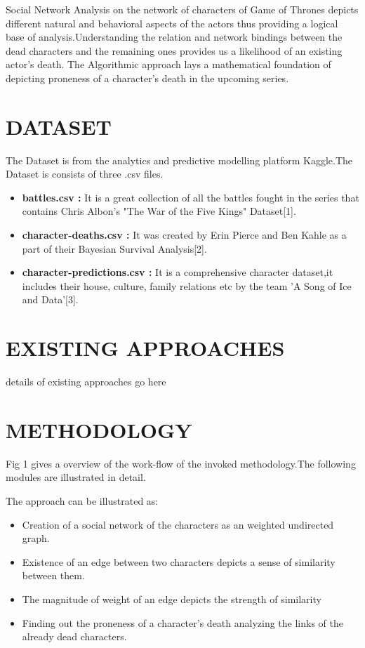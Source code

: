 \documentclass[conference]{IEEEtran}
\begin{document}
Social Network Analysis on the network of characters of Game of Thrones depicts different natural and behavioral aspects of the actors thus providing a logical base of analysis.Understanding the relation and network bindings between the dead characters and the remaining ones provides us a likelihood of an existing actor's death. The Algorithmic approach lays a mathematical foundation of depicting proneness of a character's death in the upcoming series.

\section{DATASET}

The Dataset is from the analytics and predictive modelling platform Kaggle.The Dataset is consists of three .csv files.

\begin{itemize}
  \item \textbf{battles.csv :} It is a great collection of all the battles fought in the series that contains Chris Albon's "The War of the Five Kings" Dataset[1].
  \item \textbf{character-deaths.csv :} It was created by Erin Pierce and Ben Kahle as a part of their Bayesian Survival Analysis[2].
  \item \textbf{character-predictions.csv :} It is a comprehensive character dataset,it includes their house, culture, family relations etc by the team 'A Song of Ice and Data'[3].
\end{itemize}
\section{EXISTING APPROACHES}
details of existing approaches go here

\section{METHODOLOGY}
Fig 1 gives a overview of the work-flow of the invoked methodology.The following modules are illustrated in detail.


The approach can be illustrated as:
\begin{itemize}
    \item Creation of a social network of the characters as an weighted undirected graph.
    \item Existence of an edge between two characters depicts a sense of similarity between them.
    \item The magnitude of weight of an edge depicts the strength of similarity
    \item Finding out the proneness of a character's death analyzing the links of the already dead characters.
\end{itemize}
\end{document}

